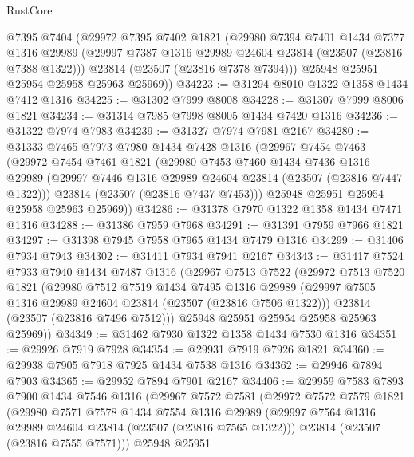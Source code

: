 \begin{lexlean}{RustCore}
\begin{coremodule}
      @7395
      @7404
      (@29972
        @7395
        @7402
        @1821
        (@29980
          @7394
          @7401
          @1434
          @7377
          @1316
          @29989
          (@29997 @7387 @1316 @29989 @24604 @23814 (@23507 (@23816 @7388 @1322)))
          @23814
          (@23507 (@23816 @7378 @7394)))
        @25948
        @25951
        @25954
        @25958
        @25963
        @25969))
@34223 := @31294 @8010 @1322 @1358 @1434 @7412 @1316
@34225 := @31302 @7999 @8008
@34228 := @31307 @7999 @8006 @1821
@34234 := @31314 @7985 @7998 @8005 @1434 @7420 @1316
@34236 := @31322 @7974 @7983
@34239 := @31327 @7974 @7981 @2167
@34280 := @31333
    @7465
    @7973
    @7980
    @1434
    @7428
    @1316
    (@29967
      @7454
      @7463
      (@29972
        @7454
        @7461
        @1821
        (@29980
          @7453
          @7460
          @1434
          @7436
          @1316
          @29989
          (@29997 @7446 @1316 @29989 @24604 @23814 (@23507 (@23816 @7447 @1322)))
          @23814
          (@23507 (@23816 @7437 @7453)))
        @25948
        @25951
        @25954
        @25958
        @25963
        @25969))
@34286 := @31378 @7970 @1322 @1358 @1434 @7471 @1316
@34288 := @31386 @7959 @7968
@34291 := @31391 @7959 @7966 @1821
@34297 := @31398 @7945 @7958 @7965 @1434 @7479 @1316
@34299 := @31406 @7934 @7943
@34302 := @31411 @7934 @7941 @2167
@34343 := @31417
    @7524
    @7933
    @7940
    @1434
    @7487
    @1316
    (@29967
      @7513
      @7522
      (@29972
        @7513
        @7520
        @1821
        (@29980
          @7512
          @7519
          @1434
          @7495
          @1316
          @29989
          (@29997 @7505 @1316 @29989 @24604 @23814 (@23507 (@23816 @7506 @1322)))
          @23814
          (@23507 (@23816 @7496 @7512)))
        @25948
        @25951
        @25954
        @25958
        @25963
        @25969))
@34349 := @31462 @7930 @1322 @1358 @1434 @7530 @1316
@34351 := @29926 @7919 @7928
@34354 := @29931 @7919 @7926 @1821
@34360 := @29938 @7905 @7918 @7925 @1434 @7538 @1316
@34362 := @29946 @7894 @7903
@34365 := @29952 @7894 @7901 @2167
@34406 := @29959
    @7583
    @7893
    @7900
    @1434
    @7546
    @1316
    (@29967
      @7572
      @7581
      (@29972
        @7572
        @7579
        @1821
        (@29980
          @7571
          @7578
          @1434
          @7554
          @1316
          @29989
          (@29997 @7564 @1316 @29989 @24604 @23814 (@23507 (@23816 @7565 @1322)))
          @23814
          (@23507 (@23816 @7555 @7571)))
        @25948
        @25951

\end{coremodule}
\end{lexlean}
